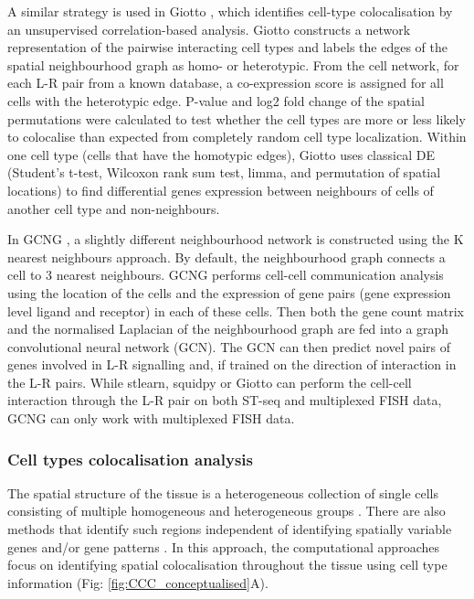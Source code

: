 A similar strategy is used in Giotto \cite{dries2021giotto}, which identifies cell-type colocalisation by an unsupervised correlation-based analysis. Giotto constructs a network representation of the pairwise interacting cell types and labels the edges of the spatial neighbourhood graph as homo- or heterotypic. From the cell network, for each L-R pair from a known database, a co-expression score is assigned for all cells with the heterotypic edge. P-value and log2 fold change of the spatial permutations were calculated to test whether the cell types are more or less likely to colocalise than expected from completely random cell type localization. Within one cell type (cells that have the homotypic edges), Giotto uses classical DE (Student’s t-test, Wilcoxon rank sum test, limma, and permutation of spatial locations) to find differential genes expression between neighbours of cells of another cell type and non-neighbours.

In GCNG \cite{yuan2020gcng}, a slightly different neighbourhood network is constructed using the K nearest neighbours approach. By default, the neighbourhood graph connects a cell to 3 nearest neighbours. GCNG performs cell-cell communication analysis using the location of the cells and the expression of gene pairs (gene expression level ligand and receptor) in each of these cells. Then both the gene count matrix and the normalised Laplacian of the neighbourhood graph are fed into a graph convolutional neural network (GCN). The GCN can then predict novel pairs of genes involved in L-R signalling and, if trained on the direction of interaction in the L-R pairs. While stlearn, squidpy or Giotto can perform the cell-cell interaction through the L-R pair on both ST-seq and multiplexed FISH data, GCNG can only work with multiplexed FISH data. 

\subsubsection{Cell types colocalisation analysis}
The spatial structure of the tissue is a heterogeneous collection of single cells consisting of multiple homogeneous and heterogeneous groups \cite{schurch2020coordinated}. There are also methods that identify such regions independent of identifying spatially variable genes and/or gene patterns \cite{moses2022museum}. In this approach, the computational approaches focus on identifying spatial colocalisation throughout the tissue using cell type information (Fig: \ref{fig:CCC_conceptualised}A). 

